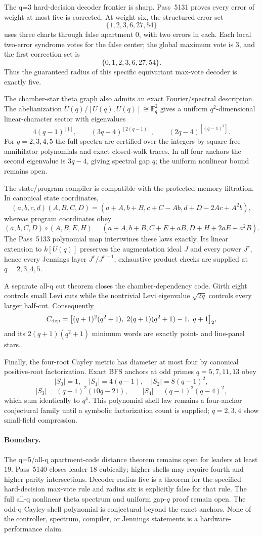 The q=3 hard-decision decoder frontier is sharp.  Pass~5131 proves every error of weight at most five is corrected.  At weight six, the structured error set
\[
 \{1,2,3,6,27,54\}
\]
uses three charts through false apartment $0$, with two errors in each.  Each local two-error syndrome votes for the false center; the global maximum vote is $3$, and the first correction set is
\[
 \{0,1,2,3,6,27,54\}.
\]
Thus the guaranteed radius of this specific equivariant max-vote decoder is exactly five.

The chamber-star theta graph also admits an exact Fourier/spectral description.  The abelianization $U(q)/[U(q),U(q)]\cong\mathbb F_q^2$ gives a uniform $q^2$-dimensional linear-character sector with eigenvalues
\[
 4(q-1)^{[1]},\qquad (3q-4)^{[2(q-1)]},\qquad (2q-4)^{[(q-1)^2]}.
\]
For $q=2,3,4,5$ the full spectra are certified over the integers by square-free annihilator polynomials and exact closed-walk traces.  In all four anchors the second eigenvalue is $3q-4$, giving spectral gap $q$; the uniform nonlinear bound remains open.

The state/program compiler is compatible with the protected-memory filtration.  In canonical state coordinates,
\[
(a,b,c,d)(A,B,C,D)=(a+A,b+B,c+C-Ab,d+D-2Ac+A^2b),
\]
whereas program coordinates obey
\[
(a,b,C,D)\circ(A,B,E,H)=(a+A,b+B,C+E+aB,D+H+2aE+a^2B).
\]
The Pass~5133 polynomial map intertwines these laws exactly.  Its linear extension to $k[U(q)]$ preserves the augmentation ideal $J$ and every power $J^r$, hence every Jennings layer $J^r/J^{r+1}$; exhaustive product checks are supplied at $q=2,3,4,5$.

A separate all-q cut theorem closes the chamber-dependency code.  Girth eight controls small Levi cuts while the nontrivial Levi eigenvalue $\sqrt{2q}$ controls every larger half-cut.  Consequently
\[
 C_{\rm dep}=\big[(q+1)^2(q^2+1),\;2(q+1)(q^2+1)-1,\;q+1\big]_2,
\]
and its $2(q+1)(q^2+1)$ minimum words are exactly point- and line-panel stars.

Finally, the four-root Cayley metric has diameter at most four by canonical positive-root factorization.  Exact BFS anchors at odd primes $q=5,7,11,13$ obey
\[
 |S_0|=1,\quad |S_1|=4(q-1),\quad |S_2|=8(q-1)^2,
\]
\[
 |S_3|=(q-1)^2(10q-21),\qquad |S_4|=(q-1)^2(q-4)^2,
\]
which sum identically to $q^4$.  This polynomial shell law remains a four-anchor conjectural family until a symbolic factorization count is supplied; $q=2,3,4$ show small-field compression.

\paragraph{Boundary.}
The q=5/all-q apartment-code distance theorem remains open for leaders at least $19$.  Pass~5140 closes leader $18$ cubically; higher shells may require fourth and higher parity intersections.  Decoder radius five is a theorem for the specified hard-decision max-vote rule and radius six is explicitly false for that rule.  The full all-q nonlinear theta spectrum and uniform gap-$q$ proof remain open.  The odd-q Cayley shell polynomial is conjectural beyond the exact anchors.  None of the controller, spectrum, compiler, or Jennings statements is a hardware-performance claim.
\fi
